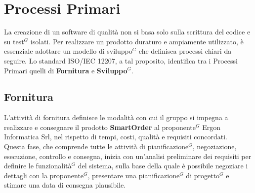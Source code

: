 \section{Processi Primari}

    La creazione di un software di qualità non si basa solo sulla scrittura del codice e su test$^G$ isolati. Per realizzare un prodotto duraturo e ampiamente utilizzato, è essenziale adottare un modello di sviluppo$^G$ che definisca processi chiari da seguire. Lo standard ISO/IEC 12207, a tal proposito, identifica tra i Processi Primari quelli di \textbf{Fornitura} e \textbf{Sviluppo$^G$}.

	\subsection{Fornitura}
	L'attività di fornitura definisce le modalità con cui il gruppo si impegna a realizzare e consegnare il prodotto \textbf{SmartOrder} al proponente$^G$ Ergon Informatica Srl, nel rispetto di tempi, costi, qualità e requisiti concordati. \\
	Questa fase, che comprende tutte le attività di pianificazione$^G$, negoziazione, esecuzione, controllo e consegna, inizia con un'analisi preliminare dei requisiti per definire le funzionalità$^G$ del sistema, sulla base della quale è possibile negoziare i dettagli con la proponente$^G$, presentare una pianificazione$^G$ di progetto$^G$ e stimare una data di consegna plausibile.
	
